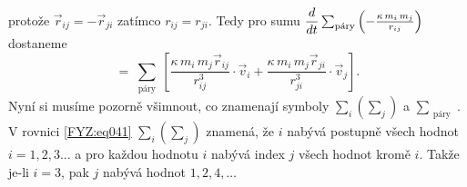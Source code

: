     protože \(\vec{r}_{ij} = - \vec{r}_{ji}\) zatímco \(r_{ij} = r_{ji}\). \newline Tedy pro sumu 
    \(\dfrac{d  }{d t}\sum_{\substack{\text{páry}}}\left(-\frac{\kappa\,m_i\,m_j}{r_{ij}}\right) \) 
    dostaneme
    \begin{equation}\label{FYZ:eq043}
     =  \sum_{\substack{\text{páry}}}
              \left[
                \frac{\kappa\,m_i\,m_j\vec{r}_{ij}}{r_{ij}^3}\cdot\vec{v}_i +
                \frac{\kappa\,m_i\,m_j\vec{r}_{ji}}{r_{ji}^3}\cdot\vec{v}_j 
              \right].
    \end{equation}
    Nyní si musíme pozorně všimnout, co znamenají symboly \(\sum_i\left(\sum_j\right)\) a 
    \(\sum_{\substack{\text{páry}}}\). V rovnici \ref{FYZ:eq041} \(\sum_i\left(\sum_j\right)\) 
    znamená, že \(i\) nabývá postupně všech hodnot \(i = 1, 2, 3 \ldots\) a pro každou hodnotu 
    \(i\) nabývá index \(j\) všech hodnot kromě \(i\). Takže je-li \(i = 3\), pak \(j\) nabývá 
    hodnot \(1, 2, 4, \ldots\)
    
